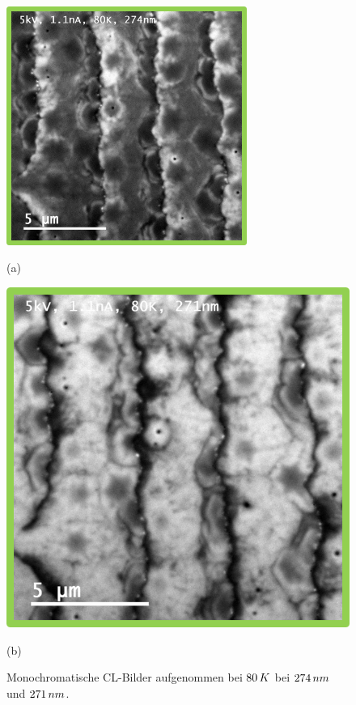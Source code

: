 \begin{figure}[htb]
  \centering
  \begin{minipage}[t]{0.49\textwidth}
    \centering
    \includegraphics[width=0.7\textwidth]{Bilder/TS4048/cSLELOmonocllow.png}
		\caption{(a)}
  \end{minipage}
	\hfill
  \begin{minipage}[t]{0.49\textwidth}
    \centering
    \includegraphics[width=0.7\linewidth]{Bilder/TS4048/cSLELOmonoclpeak.png}
		\caption{(b)}
  \end{minipage}
	\caption{Monochromatische CL-Bilder aufgenommen bei $80 \thinspace K$ bei $274 \thinspace nm$ und $271 \thinspace nm$. }
	\label{fig:monoclgesamt}
\end{figure}
\noindent 
